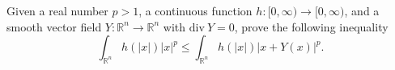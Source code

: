 Given a real number $p>1$, a continuous function $h\colon [0,\infty)\to [0,\infty)$, and a smooth vector field $Y\colon \mathbb{R}^n \to \mathbb{R}^n$ with $\mathrm{div}~Y=0$, prove the following inequality
\[\int_{\mathbb{R}^n}h(|x|)|x|^{p}\leq \int_{\mathbb{R}^{n}}h(|x|)|x+Y(x)|^{p}.\]
